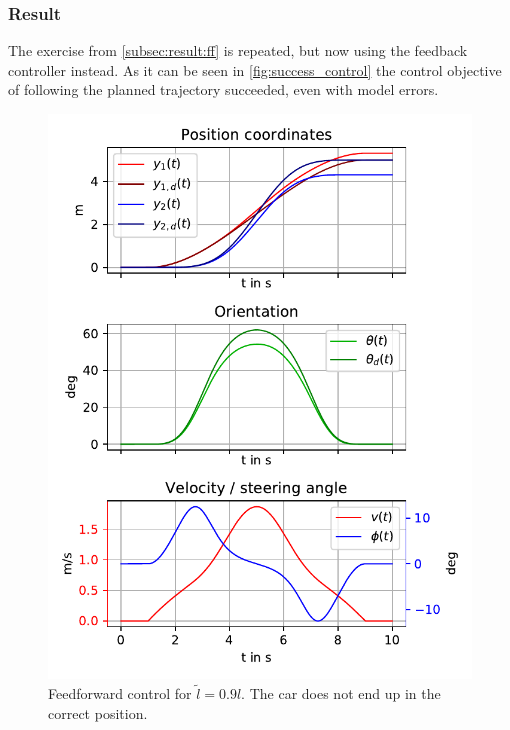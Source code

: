 \documentclass[a4paper,12pt,headinclude=true,headsepline,parskip=half,DIV=12]{scrartcl}
\begin{document}
\subsubsection{Result} \label{sec:result:fb}
The exercise from \autoref{subsec:result:ff} is repeated, but now using the feedback controller instead. As it can be seen in \autoref{fig:success_control} the control objective of following the planned trajectory succeeded, even with model errors.
\begin{figure}[ht]
  \centering
  \includegraphics[scale=1]{img/failedcontrol.pdf}
  \caption{Feedforward control for $\tilde{l}=0.9l$. The car does not end up in the correct position.}
  \label{fig:failed_control}
\end{figure}
\end{document}
